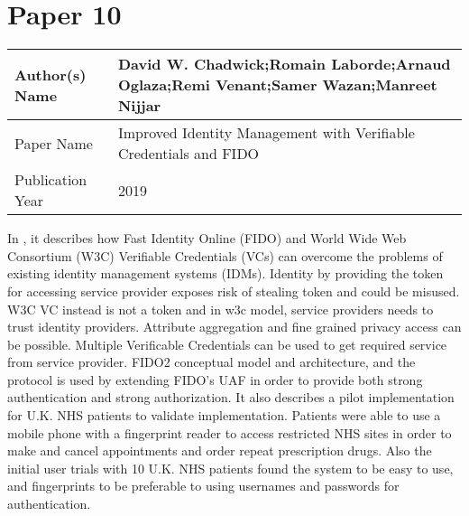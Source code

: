\section{Paper 10}
    \begin{center}
    \begin{tabular}{ | m{5em} | m{25em} |} 
      \hline
      Author(s) Name &  David W. Chadwick;Romain Laborde;Arnaud Oglaza;Remi Venant;Samer Wazan;Manreet Nijjar\\ 
      \hline
      Paper Name &  Improved Identity Management with Verifiable Credentials and FIDO\\ 
      \hline
      Publication Year &  2019\\ 
      \hline
    \end{tabular}
    \end{center}
    In \cite{9031543}, it describes how Fast Identity Online (FIDO) and World Wide Web Consortium (W3C) Verifiable Credentials (VCs) can overcome the problems of existing identity management systems (IDMs). Identity by providing the token for accessing service provider exposes risk of stealing token and could be misused. W3C VC instead is not a token and in w3c model, service providers needs to trust identity providers. Attribute aggregation and fine grained privacy access can be possible. Multiple Verificable Credentials can be used to get required service from service provider. FIDO2 conceptual model and architecture, and the protocol is used by extending FIDO's UAF in order to provide both strong authentication and strong authorization. It also describes a pilot implementation for U.K. NHS patients to validate implementation. Patients were able to use a mobile phone with a fingerprint reader to access restricted NHS sites in order to make and cancel appointments and order repeat prescription drugs. Also the initial user trials with 10 U.K. NHS patients found the system to be easy to use, and fingerprints to be preferable to using usernames and passwords for authentication.